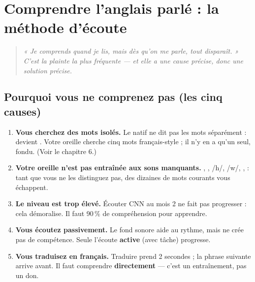 \chapter{Comprendre l'anglais parlé : la méthode d'écoute}

\begin{quote}\itshape
« Je comprends quand je lis, mais dès qu'on me parle, tout disparaît. »
C'est la plainte la plus fréquente --- et elle a une cause précise, donc une solution précise.
\end{quote}

\section{Pourquoi vous ne comprenez pas (les cinq causes)}
\begin{enumerate}
  \item \textbf{Vous cherchez des mots isolés.} Le natif ne dit pas les mots séparément :
   devient . Votre oreille cherche
  cinq mots français-style ; il n'y en a qu'un seul, fondu. (Voir le chapitre 6.)
  \item \textbf{Votre oreille n'est pas entraînée aux sons manquants.} \ipatheta, \ipadh, /h/,
  /w/, \ipang, \ipeschwa : tant que vous ne les distinguez pas, des dizaines de mots
  courants vous échappent.
  \item \textbf{Le niveau est trop élevé.} Écouter CNN au mois 2 ne fait pas progresser :
  cela démoralise. Il faut 90\,\% de compréhension pour apprendre.
  \item \textbf{Vous écoutez passivement.} Le fond sonore aide au rythme, mais ne crée pas
  de compétence. Seule l'écoute \textbf{active} (avec tâche) progresse.
  \item \textbf{Vous traduisez en français.} Traduire prend 2 secondes ; la phrase suivante
  arrive avant. Il faut comprendre \textbf{directement} --- c'est un entraînement, pas un don.
\end{enumerate}

